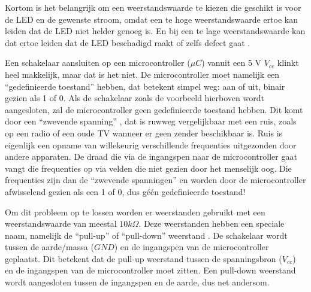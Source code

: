 Kortom is het belangrijk om een weerstandswaarde te kiezen die geschikt is voor de LED en de gewenste stroom, 
omdat een te hoge weerstandswaarde ertoe kan leiden dat de LED niet helder genoeg is. En bij een te lage weerstandswaarde kan dat ertoe leiden dat de LED beschadigd raakt of zelfs defect gaat \cite{ResistorForLED}. 

Een schakelaar aansluiten op een microcontroller (\(\mu C\)) vanuit een 5 V \(V_{cc}\) klinkt heel makkelijk, maar dat is het niet. 
De microcontroller moet namelijk een ``gedefinieerde toestand'' hebben, dat betekent simpel weg: aan of uit, binair gezien als 1 of 0. 
Als de schakelaar zoals de voorbeeld hierboven wordt aangesloten, zal de microcontroller geen gedefinieerde toestand hebben. 
Dit komt door een ``zwevende spanning'' \cite{saslow2007electricity}, dat is ruwweg vergelijkbaar met een ruis, zoals op een radio of een oude TV wanneer er geen zender beschikbaar is.
Ruis is eigenlijk een opname van willekeurig verschillende frequenties uitgezonden door andere apparaten. 
De draad die via de ingangspen naar de microcontroller gaat vangt die frequenties op via velden die niet gezien door het menselijk oog. 
Die frequenties zijn dan de ``zwevende spanningen'' en worden door de microcontroller afwisselend gezien als een 1 of 0, dus géén gedefinieerde toestand! 

Om dit probleem op te lossen worden er weerstanden gebruikt met een weerstandswaarde van meestal \(10k\Omega\). 
Deze weerstanden hebben een speciale naam, namelijk de ``pull-up'' of ``pull-down'' weerstand \cite{Platt2012-dz}. 
De schakelaar wordt tussen de aarde/massa (\(GND\)) en de ingangspen van de microcontroller geplaatst. 
Dit betekent dat de pull-up weerstand tussen de spanningsbron (\(V_{cc}\)) en de ingangspen van de microcontroller moet zitten.
Een pull-down weerstand wordt aangesloten tussen de ingangspen en de aarde, dus net andersom. 

